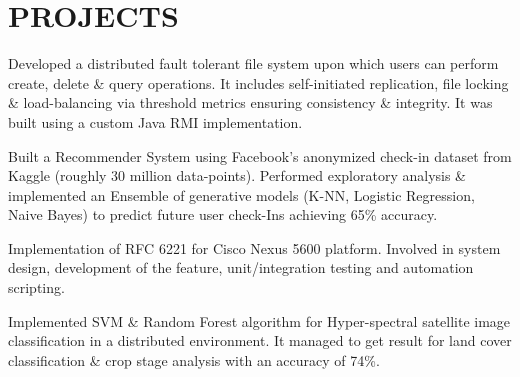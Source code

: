 \documentclass[]{deedy-resume-openfont}
\begin{document}
\begin{minipage}[t]{0.66\textwidth}

\section{PROJECTS}

\begin{tightemize}
\item Developed a distributed fault tolerant file system upon which users can perform create, delete \& query operations. It includes self-initiated replication, file locking \& load-balancing via threshold metrics ensuring consistency \& integrity. It was built using a custom Java RMI implementation.
\end{tightemize}
\sectionsep

\begin{tightemize}
\item Built a Recommender System using Facebook's anonymized check-in dataset from Kaggle (roughly 30 million data-points). Performed exploratory analysis \& implemented an Ensemble of generative models (K-NN, Logistic Regression, Naive Bayes) to predict future user check-Ins achieving 65\% accuracy.
\end{tightemize}
\sectionsep

\begin{tightemize}
\item Implementation of RFC 6221 for Cisco Nexus 5600 platform. Involved in system design, development of the feature, unit/integration testing and automation scripting. 
\end{tightemize}
\sectionsep

\begin{tightemize}
\item Implemented SVM \& Random Forest algorithm for Hyper-spectral satellite image classification in a distributed environment. It managed to get result for land cover classification \& crop stage analysis with an accuracy of 74\%. 
\end{tightemize}
\sectionsep

\end{minipage} 
\end{document}

